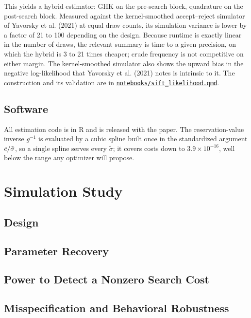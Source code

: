 \documentclass[
  letterpaper,
  DIV=11,
  numbers=noendperiod]{scrartcl}
\begin{document}
This yields a hybrid estimator: GHK on the pre-search block, quadrature
on the post-search block. Measured against the kernel-smoothed
accept--reject simulator of Yavorsky et al. (2021) at equal draw counts,
its simulation variance is lower by a factor of 21 to 100 depending on
the design. Because runtime is exactly linear in the number of draws,
the relevant summary is time to a given precision, on which the hybrid
is 3 to 21 times cheaper; crude frequency is not competitive on either
margin. The kernel-smoothed simulator also shows the upward bias in the
negative log-likelihood that Yavorsky et al. (2021) notes is intrinsic
to it. The construction and its validation are in
\href{../notebooks/sift_likelihood.qmd}{\texttt{notebooks/sift\_likelihood.qmd}}.

\subsection{Software}\label{sec-est-software}

All estimation code is in R and is released with the paper. The
reservation-value inverse \(g^{-1}\) is evaluated by a cubic spline
built once in the standardized argument \(c/\tilde\sigma\), so a
single spline serves every \(\tilde\sigma\); it covers costs down to
\(3.9\times10^{-16}\), well below the range any optimizer will propose.

\section{Simulation Study}\label{sec-simstudy}

\subsection{Design}\label{design}

\subsection{Parameter Recovery}\label{parameter-recovery}

\subsection{Power to Detect a Nonzero Search
Cost}\label{power-to-detect-a-nonzero-search-cost}

\subsection{Misspecification and Behavioral
Robustness}\label{misspecification-and-behavioral-robustness}
\end{document}
